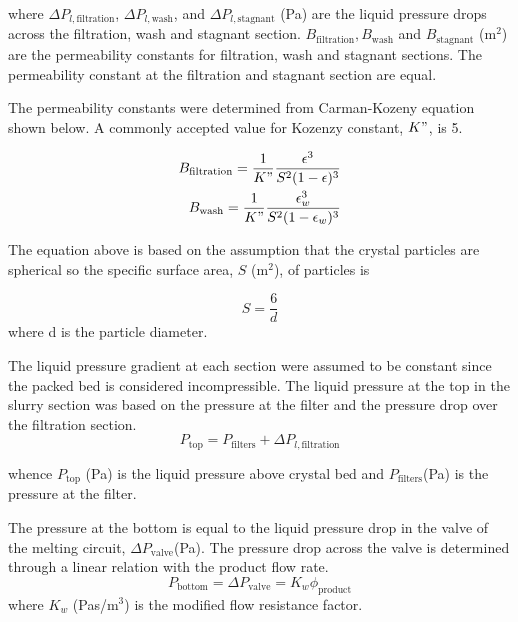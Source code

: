 \noindent where $\Delta P_{l,\mathrm{filtration}}$, $\Delta P_{l,\mathrm{wash}}$, and $\Delta P_{l,\mathrm{stagnant}}$ (Pa) are the liquid pressure drops across the filtration, wash and stagnant section. $B_{\mathrm{filtration}},B_{\mathrm{wash}}$ and $B_{\mathrm{stagnant}}$ (m$^2$) are the permeability constants for filtration, wash and stagnant sections. The permeability constant at the filtration and stagnant section are equal. 

The permeability constants were determined  from Carman-Kozeny equation shown below. A commonly accepted value for Kozenzy constant, $K"$, is 5.

\begin{align}
   B_{\mathrm{filtration}} = \frac{1}{K"}\frac{\epsilon^3}{S^2(1-\epsilon)^3} \\
   B_{\mathrm{wash}} = \frac{1}{K"}\frac{\epsilon_w^3}{S^2(1-\epsilon_w)^3} \\
\end{align}

The equation above is based on the assumption that the crystal particles are spherical so the specific surface area, $S$ (m$^2$), of particles is 

\begin{equation}
S = \frac{6}{d}
\end{equation}
\noindent where d is the particle diameter. 

The liquid pressure gradient at each section were assumed to be constant since the packed bed is considered incompressible. The liquid pressure at the top in the slurry section was based on the pressure at the filter and the pressure drop over the filtration section. 
\begin{equation}
P_{\mathrm{top}} = P_{\mathrm{filters}} + \Delta P_{l,\mathrm{filtration}}
\end{equation}

\noindent whence $P_{\mathrm{top}}$ (Pa) is the liquid pressure above crystal bed and $P_{\mathrm{filters}} $(Pa) is the pressure at the filter.

The pressure at the bottom is equal to the liquid pressure drop in the valve of the melting circuit, $\Delta P_{\mathrm{valve}} $(Pa). The pressure drop across the valve is determined through a linear relation with the product flow rate.
\begin{equation}
P_{\mathrm{bottom}}=\Delta P_{\mathrm{valve}} = K_w\phi_{\mathrm{product}}
\end{equation}
\noindent where $K_w$ (Pas/m$^3$) is the modified flow resistance factor.  

